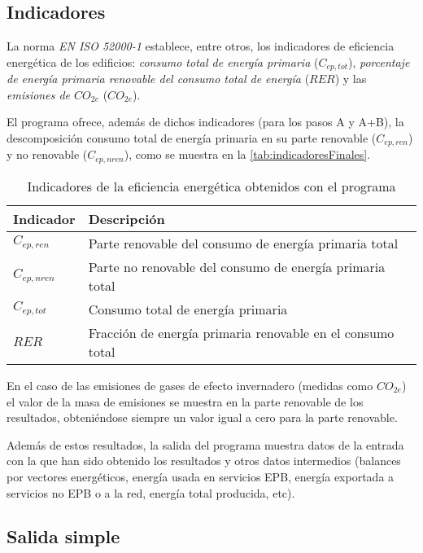 \documentclass[10pt,notitlepage,oneside,a4paper]{article}
\begin{document}
\subsection{Indicadores}

La norma \textit{EN ISO 52000-1} establece, entre otros, los indicadores de eficiencia energética de los edificios: \textit{consumo total de energía primaria} (\texttt{$C_{ep,tot}$}), \textit{porcentaje de energía primaria renovable del consumo total de energía} (\texttt{$RER$}) y las \textit{emisiones de $CO_{2e}$} (\texttt{$CO_{2e}$}).

El programa ofrece, además de dichos indicadores (para los pasos A y A+B), la descomposición consumo total de energía primaria en su parte renovable (\texttt{$C_{ep,ren}$}) y no renovable (\texttt{$C_{ep,nren}$}), como se muestra en la \autoref{tab:indicadoresFinales}.

\begin{table}[H]
\centering
\small
\caption{Indicadores de la eficiencia energética obtenidos con el programa}\label{tab:indicadoresFinales}
\begin{tabular}{ll}
    \toprule
    \textbf{Indicador} & \textbf{Descripción}\\
    \midrule
    $C_{ep,ren}$ & Parte renovable del consumo de energía primaria total\\
    $C_{ep,nren}$& Parte no renovable del consumo de energía primaria total\\
    $C_{ep,tot}$ & Consumo total de energía primaria\\
    $RER$      & Fracción de energía primaria renovable en el consumo total\\
    \bottomrule
\end{tabular}
\end{table}

En el caso de las emisiones de gases de efecto invernadero (medidas como $CO_{2e}$) el valor de la masa de emisiones se muestra en la parte renovable de los resultados, obteniéndose siempre un valor igual a cero para la parte renovable.

Además de estos resultados, la salida del programa muestra datos de la entrada con la que han sido obtenido los resultados y otros datos intermedios (balances por vectores energéticos, energía usada en servicios EPB, energía exportada a servicios no EPB o a la red, energía total producida, etc).

\subsection{Salida simple}
\end{document}
